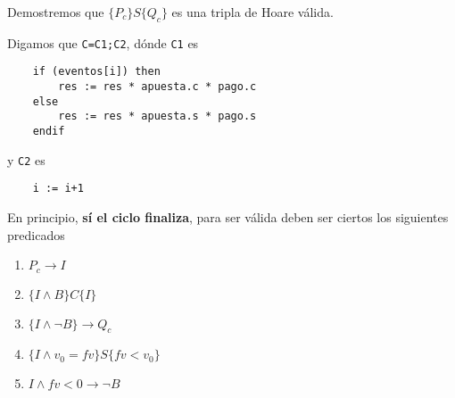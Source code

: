 \documentclass[../document.tex]{subfiles}
\begin{document}
Demostremos que $\{P_c\}S\{Q_c\}$ es una tripla de Hoare válida.

Digamos que \verb+C=C1;C2+, dónde \verb+C1+ es
\begin{verbatim}
    if (eventos[i]) then
        res := res * apuesta.c * pago.c
    else
        res := res * apuesta.s * pago.s
    endif
\end{verbatim}

y \verb+C2+ es
\begin{verbatim}
    i := i+1
\end{verbatim}

En principio, \textbf{sí el ciclo finaliza}, para ser válida deben ser ciertos los siguientes predicados
\begin{enumerate}
    \item $P_c \to I$
    \item $\{I \land B\}C\{I\}$
    \item $\{I \land \neg B\} \to Q_c$
    \item $\{I \land v_0 = fv\} S \{fv < v_0\}$
    \item $I \land fv<0 \to \neg B$
\end{enumerate}
\end{document}
